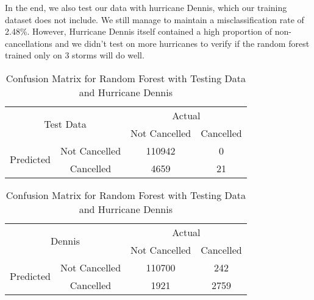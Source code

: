 In the end, we also test our data with hurricane Dennis, which our training dataset does not include. We still manage to maintain a misclassification rate of 2.48\%. However, Hurricane Dennis itself contained a high proportion of non-cancellations and we didn't test on more hurricanes to verify if the random forest trained only on 3 storms will do well. 


\begin{table}[H]
\centering
\begin{subtable}{.5\textwidth}
\centering
\begin{tabular}{@{}|c|c|c|c|@{}}
\toprule
\multicolumn{2}{|c|}{\multirow{2}{*}{Test Data}} & \multicolumn{2}{c|}{Actual} \\ \cmidrule(l){3-4} 
\multicolumn{2}{|c|}{}                        & Not Cancelled          & Cancelled         \\ \midrule
\multirow{2}{*}{Predicted}       & Not Cancelled        & 110942        & 0 \\ \cmidrule(l){2-4} 
                                 & Cancelled       & 4659         & 21        \\ \bottomrule
\end{tabular}

\begin{tabular}{@{}|c|c|c|c|@{}}
\toprule
\multicolumn{2}{|c|}{\multirow{2}{*}{Dennis}} & \multicolumn{2}{c|}{Actual} \\ \cmidrule(l){3-4} 
\multicolumn{2}{|c|}{}                        & Not Cancelled         &  Cancelled         \\ \midrule
\multirow{2}{*}{Predicted}       & Not Cancelled       & 110700   	  & 242 \\ \cmidrule(l){2-4} 
                                 & Cancelled       & 1921 		  & 2759 \\ \bottomrule
\end{tabular}
\end{subtable}
\caption{Confusion Matrix for Random Forest with Testing Data and Hurricane Dennis}
\label{Confusion_MLP}
\end{table}

